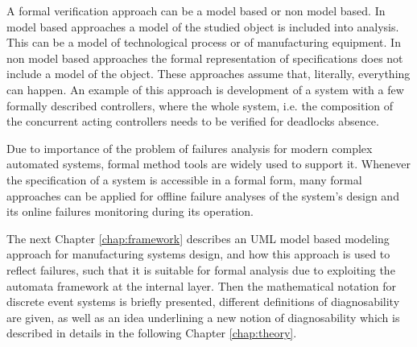 A formal verification approach can be a model based or non model based. In 
model based approaches a model of the studied object is included into analysis.
This can be a model of technological process or of manufacturing equipment. In
non model based approaches the formal representation of specifications does not
include a model of the object. These approaches assume that, literally,
everything can happen. An example of this approach is development of a system
with a few formally described controllers, where the whole system, i.e. the
composition of the concurrent acting controllers needs to be verified for
deadlocks absence.

Due to importance of the problem of failures analysis for modern complex
automated systems, formal method tools are widely used to support it.
Whenever the specification of a system is accessible in a formal form, many
formal approaches can be applied for offline failure analyses of the system's
design and its online failures monitoring during its operation. 

The next Chapter \ref{chap:framework} describes an UML model based 
modeling approach for manufacturing systems design, and how this approach is
used to reflect failures, such that it is suitable for formal analysis due to
exploiting the automata framework at the internal layer. Then the
mathematical notation for discrete event systems is briefly presented,
different definitions of diagnosability are given, as well as an idea
underlining a new notion of diagnosability which is described in details in the
following Chapter \ref{chap:theory}.
